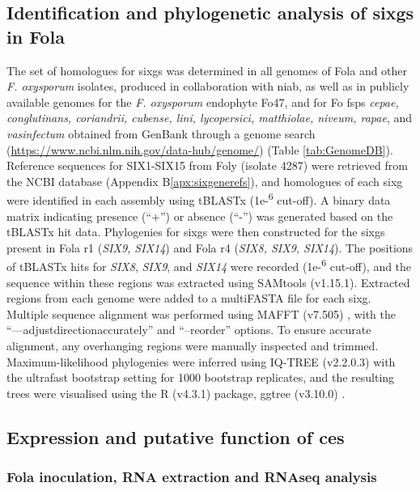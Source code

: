 \subsection{Identification and phylogenetic analysis of \aclp{sixg} in \acl{Fola}}

The set of homologues for \acp{sixg} was determined in all genomes of \ac{Fola} and other \textit{F. oxysporum} isolates, produced in collaboration with \ac{niab}, as well as in publicly available genomes for the \textit{F. oxysporum} endophyte Fo47, and for \ac{Fo} \acp{fsp} \textit{cepae, conglutinans, coriandrii, cubense, lini, lycopersici, matthiolae, niveum, rapae}, and \textit{vasinfectum} obtained from GenBank through a genome search (\href{https://www.ncbi.nlm.nih.gov/data-hub/genome/}{https://www.ncbi.nlm.nih.gov/data-hub/genome/}) (Table \ref{tab:GenomeDB}). Reference sequences for SIX1-SIX15 from \ac{Foly} (isolate 4287) were retrieved from the NCBI database (Appendix B\ref{apx:sixgenerefs}), and homologues of each \ac{sixg} were identified in each assembly using tBLASTx (1e-\textsuperscript{6} cut-off). A binary data matrix indicating presence (“+”) or absence (“-”) was generated based on the tBLASTx hit data. Phylogenies for \acp{sixg} were then constructed for the \acp{sixg} present in \ac{Fola} \ac{r1} (\textit{SIX9, SIX14}) and \ac{Fola} \ac{r4} (\textit{SIX8, SIX9, SIX14}). The positions of tBLASTx hits for \textit{SIX8}, \textit{SIX9}, and \textit{SIX14} were recorded (1e-\textsuperscript{6} cut-off), and the sequence within these regions was extracted using SAMtools (v1.15.1). Extracted regions from each genome were added to a multiFASTA file for each \ac{sixg}. Multiple sequence alignment was performed using MAFFT (v7.505) \parencite{Katoh2019}, with the “—adjustdirectionaccurately” and “–reorder” options. To ensure accurate alignment, any overhanging regions were manually inspected and trimmed. Maximum-likelihood phylogenies were inferred using IQ-TREE (v2.2.0.3) \parencite{Nguyen2015} with the ultrafast bootstrap setting for 1000 bootstrap replicates, and the resulting trees were visualised using the R (v4.3.1)  \parencite{R} package, ggtree (v3.10.0) \parencite{ggtree}.


\subsection{Expression and putative function of \acp{ce}}

\subsubsection{\Acf{Fola} inoculation, RNA extraction and RNAseq analysis}

